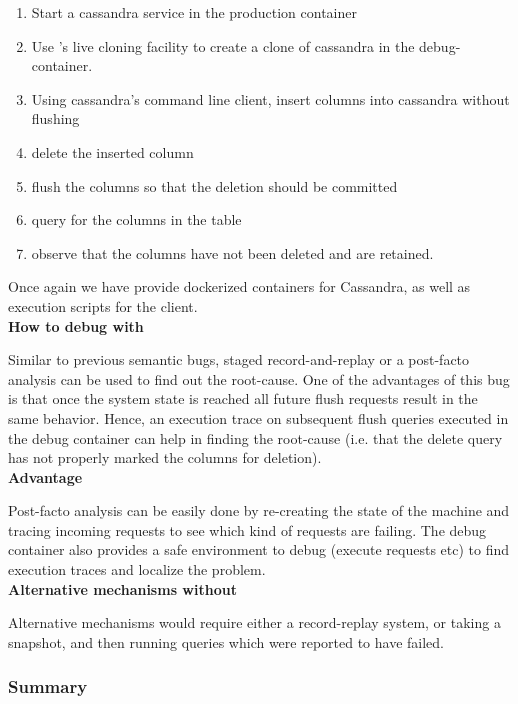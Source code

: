 \begin{adjustwidth}{0.5cm}{}
	\begin{enumerate}
		\item Start a cassandra service in the production container
		\item Use \parikshan's live cloning facility to create a clone of cassandra in the debug-container.
		\item Using cassandra's command line client, insert columns into cassandra without flushing
		\item delete the inserted column
		\item flush the columns so that the deletion should be committed
		\item query for the columns in the table
		\item observe that the columns have not been deleted and are retained.
	\end{enumerate}
\end{adjustwidth}

Once again we have provide dockerized containers for Cassandra, as well as execution scripts for the client.\\

\noindent \textbf{How to debug with \parikshan}

Similar to previous semantic bugs, staged record-and-replay or a post-facto analysis can be used to find out the root-cause. One of the advantages of this bug is that once the system state is reached all future flush requests result in the same behavior. Hence, an execution trace on subsequent flush queries executed in the debug container can help in finding the root-cause (i.e. that the delete query has not properly marked the columns for deletion). \\

\noindent \textbf{Advantage}

Post-facto analysis can be easily done by re-creating the state of the machine and tracing incoming requests to see which kind of requests are failing. The debug container also provides a safe environment to debug (execute requests etc) to find execution traces and localize the problem.\\

\noindent \textbf{Alternative mechanisms without \parikshan}

Alternative mechanisms would require either a record-replay system, or taking a snapshot, and then running queries which were reported to have failed.

\subsubsection{Summary}

